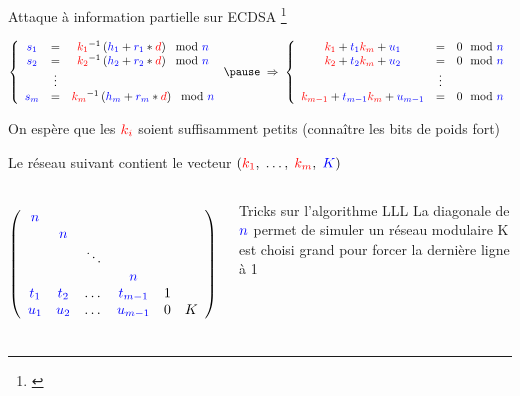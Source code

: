 \begin{frame}{Attaque à information partielle sur ECDSA \footnote{\cite{demicheli:hal-03045663}}}

\[\left\{
\begin{array}{c c c}
\k{s_1} & = &\u{k_1}^{-1}\left(\k{h_1}+\k{r_1}*\u{d}\right) \mod \k{n} \\
\k{s_2} & = &\u{k_2}^{-1}\left(\k{h_2}+\k{r_2}*\u{d}\right) \mod \k{n} \\
&\vdots& \\
\k{s_m} & = &\u{k_m}^{-1}\left(\k{h_m}+\k{r_m}*\u{d}\right) \mod \k{n} \\
\end{array}
\right.
\pause
\;\Rightarrow\;
\left\{
\begin{array}{c c c}
\u{k_1}+\k{t_1}\u{k_m} + \k{u_1} & = & 0 \mod \k{n} \\
\u{k_2}+\k{t_2}\u{k_m} + \k{u_2} & = & 0 \mod \k{n} \\
&\vdots&\\
\u{k_{m-1}}+\k{t_{m-1}}\u{k_m} + \k{u_{m-1}} & = & 0 \mod \k{n} \\
\end{array}
\right.\]

\pause
\begin{center}
    On espère que les $\textcolor{red}{k_i}$ soient suffisamment petits (connaître les bits de poids fort)
    \pause
    
    Le réseau suivant contient le vecteur $(\textcolor{red}{k_1},\;\dots,\;\textcolor{red}{k_m},\;\textcolor{blue}{K})$
\end{center}
    \begin{columns}[c]
        \[\left(
        \begin{array}{c c c c c c}
        \textcolor{blue}{n} &   &        &   &   &    \\
          & \textcolor{blue}{n} &        &   &   &   \\
          &   & \ddots &   &   &    \\
          &   &        & \textcolor{blue}{n} &   &   \\
        \textcolor{blue}{t_1}  &   \textcolor{blue}{t_2} &  \dots    &  \textcolor{blue}{t_{m-1}}  & 1 &   \\
        \textcolor{blue}{u_1}  &   \textcolor{blue}{u_2} &  \dots    &  \textcolor{blue}{u_{m-1}}  & 0 & K  \\
        \end{array}
        \right)\]
        \pause
           \begin{outline}
           \1 Tricks sur l'algorithme LLL
            \pause
            \2 La diagonale de $\textcolor{blue}{n}$ permet de simuler un réseau modulaire
            \pause
            \2 K est choisi grand pour forcer la dernière ligne à 1
           \end{outline}
    \end{columns}


\end{frame}


